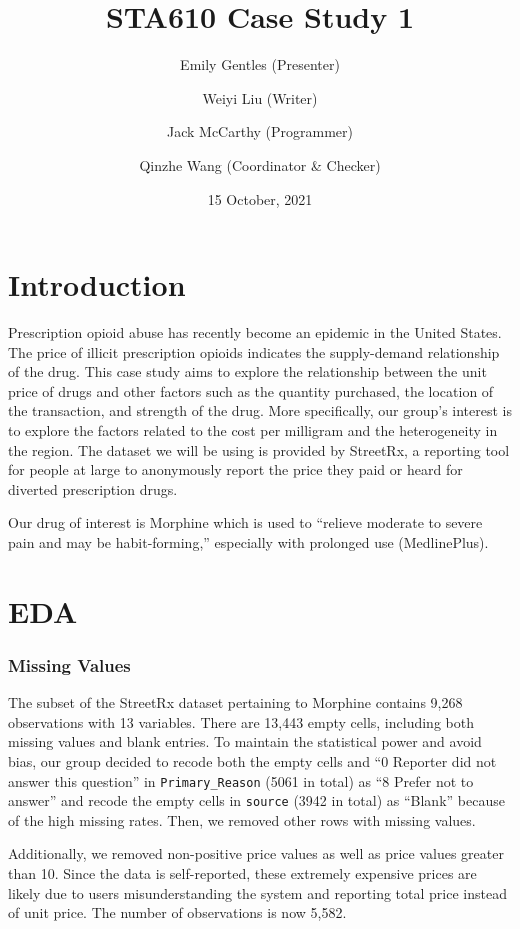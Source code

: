 \documentclass[
  11pt,
]{article}
\title{STA610 Case Study 1}
\author{Emily Gentles (Presenter) \and Weiyi Liu (Writer) \and Jack
McCarthy (Programmer) \and Qinzhe Wang (Coordinator \& Checker)}
\date{15 October, 2021}
\begin{document}
\maketitle

\hypertarget{introduction}{%
\section{Introduction}\label{introduction}}

Prescription opioid abuse has recently become an epidemic in the United
States. The price of illicit prescription opioids indicates the
supply-demand relationship of the drug. This case study aims to explore
the relationship between the unit price of drugs and other factors such
as the quantity purchased, the location of the transaction, and strength
of the drug. More specifically, our group's interest is to explore the
factors related to the cost per milligram and the heterogeneity in the
region. The dataset we will be using is provided by StreetRx, a
reporting tool for people at large to anonymously report the price they
paid or heard for diverted prescription drugs.

Our drug of interest is Morphine which is used to ``relieve moderate to
severe pain and may be habit-forming,'' especially with prolonged use
(MedlinePlus).

\hypertarget{eda}{%
\section{EDA}\label{eda}}

\hypertarget{missing-values}{%
\subsubsection{Missing Values}\label{missing-values}}

The subset of the StreetRx dataset pertaining to Morphine contains 9,268
observations with 13 variables. There are 13,443 empty cells, including
both missing values and blank entries. To maintain the statistical power
and avoid bias, our group decided to recode both the empty cells and ``0
Reporter did not answer this question'' in \texttt{Primary\_Reason}
(5061 in total) as ``8 Prefer not to answer'' and recode the empty cells
in \texttt{source} (3942 in total) as ``Blank'' because of the high
missing rates. Then, we removed other rows with missing values.

Additionally, we removed non-positive price values as well as price
values greater than 10. Since the data is self-reported, these extremely
expensive prices are likely due to users misunderstanding the system and
reporting total price instead of unit price. The number of observations
is now 5,582.
\end{document}
